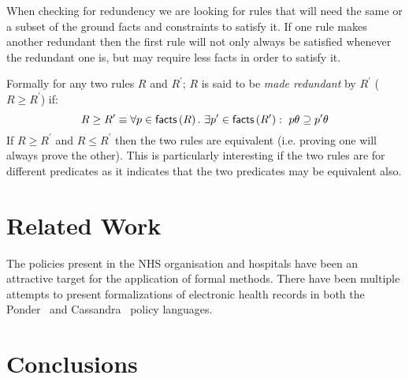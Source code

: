 \documentclass[a4paper]{article}
\begin{document}
When checking for redundency we are looking for rules that will need the same or a subset of the ground facts and constraints to satisfy it.
If one rule makes another redundant then the first rule will not only always be satisfied whenever the redundant one is, but may require less facts in order to satisfy it.

Formally for any two rules $R$ and $R^\prime$; $R$ is said to be \emph{made redundant} by $R^\prime$ ($R\geq R^\prime$) if:
\begin{equation}
  R \geq R^\prime \equiv \forall p \in \textsf{facts}\left(R\right).~\exists p^\prime \in \textsf{facts}\left(R^\prime\right):~p\theta \supseteq p^\prime\theta
\end{equation}
If $R\geq R^\prime$ and $R\leq R^\prime$ then the two rules are equivalent (i.e. proving one will always prove the other).  This is particularly interesting if the two rules are for different predicates as it indicates that the two predicates may be equivalent also.
  
\section{Related Work}
\label{sec:related}

The policies present in the NHS organisation and hospitals have been an attractive target for the application of formal methods.
There have been multiple attempts to present formalizations of electronic health records in both the Ponder~\cite{blobel_authorization_2004} and Cassandra~\cite{becker_cassandra_2004} policy languages.

\section{Conclusions}
\label{sec:conclusions}

{}

\end{document}
